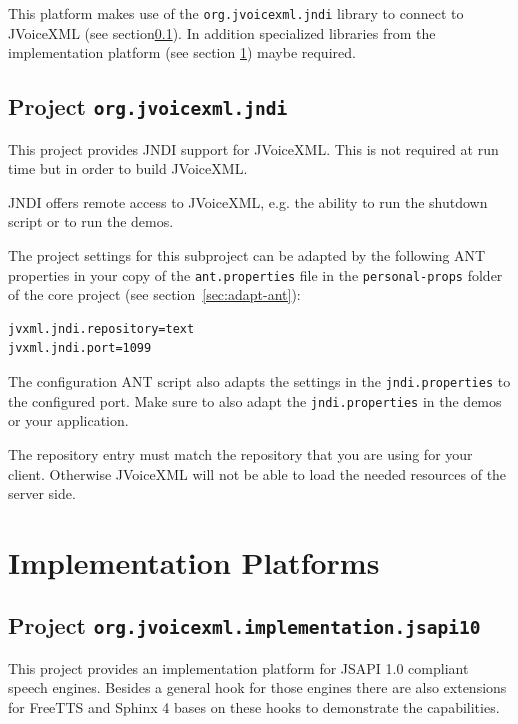 \documentclass[11pt,a4paper]{article}
\begin{document}
This platform makes use of the \lstinline{org.jvoicexml.jndi} library
to connect to JVoiceXML (see section\ref{sec:jndi}). In addition specialized
libraries from the implementation platform (see section
\ref{sec:implementation-platforms}) maybe required.

\subsection{Project \texttt{org.jvoicexml.jndi}}
\label{sec:jndi}

This project provides JNDI support for JVoiceXML. This is not required at run
time but in order to build JVoiceXML.

JNDI offers remote access to JVoiceXML, e.g. the ability to run the
shutdown script or to run the demos.

The project settings for this subproject can be adapted by the following ANT
properties in your copy of the \texttt{ant.properties} file in the
\texttt{personal-props} folder of the core project (see 
section~\ref{sec:adapt-ant}):
\begin{lstlisting}
jvxml.jndi.repository=text
jvxml.jndi.port=1099
\end{lstlisting}

The configuration ANT script also adapts the settings in the
\texttt{jndi.properties} to the configured port. Make sure to also adapt
the \texttt{jndi.properties} in the demos or your application.

The repository entry must match the repository that you are using for your
client. Otherwise JVoiceXML will not be able to load the needed resources of
the server side.

\section{Implementation Platforms}
\label{sec:implementation-platforms}

\subsection{Project \texttt{org.jvoicexml.implementation.jsapi10}}
\label{sec:implementation-jsapi10}

This project provides an implementation platform for JSAPI 1.0 compliant
speech engines. Besides a general hook for those engines there are also
extensions for FreeTTS and Sphinx 4 bases on these hooks to demonstrate the
capabilities.
\end{document}
